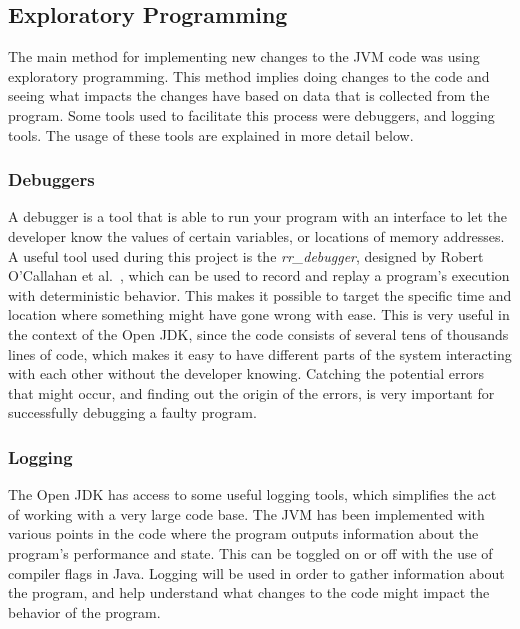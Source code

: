 

\subsection{Exploratory Programming}
The main method for implementing new changes to the JVM code was using exploratory programming. This method implies doing changes to the code and seeing what impacts the changes have based on data that is collected from the program. Some tools used to facilitate this process were debuggers, and logging tools. The usage of these tools are explained in more detail below.
\subsubsection{Debuggers}
A debugger is a tool that is able to run your program with an interface to let the developer know the values of certain variables, or locations of memory addresses. A useful tool used during this project is the \textit{rr\_debugger}, designed by Robert O'Callahan et al.~\cite{rrdebugger}, which can be used to record and replay a program's execution with deterministic behavior. This makes it possible to target the specific time and location where something might have gone wrong with ease. This is very useful in the context of the Open JDK, since the code consists of several tens of thousands lines of code, which makes it easy to have different parts of the system interacting with each other without the developer knowing. Catching the potential errors that might occur, and finding out the origin of the errors, is very important for successfully debugging a faulty program.

\subsubsection{Logging}
The Open JDK has access to some useful logging tools, which simplifies the act of working with a very large code base. The JVM has been implemented with various points in the code where the program outputs information about the program's performance and state. This can be toggled on or off with the use of compiler flags in Java. Logging will be used in order to gather information about the program, and help understand what changes to the code might impact the behavior of the program.
